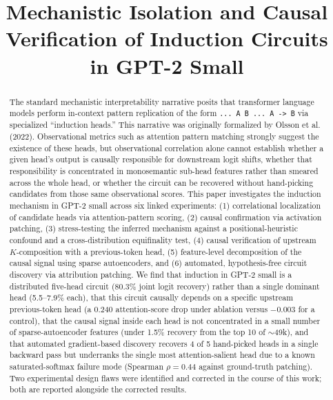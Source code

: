 \documentclass[conference]{IEEEtran}
\begin{document}
\title{Mechanistic Isolation and Causal Verification of Induction Circuits in GPT-2 Small\\ }

\author{
}

\maketitle

\begin{abstract}

The standard mechanistic interpretability narrative posits that transformer language models perform in-context pattern replication of the form \texttt{... A B ... A -> B} via specialized ``induction heads.'' This narrative was originally formalized by Olsson et al. (2022). Observational metrics such as attention pattern matching strongly suggest the existence of these heads, but observational correlation alone cannot establish whether a given head's output is causally responsible for downstream logit shifts, whether that responsibility is concentrated in monosemantic sub-head features rather than smeared across the whole head, or whether the circuit can be recovered without hand-picking candidates from those same observational scores. This paper investigates the induction mechanism in GPT-2 small across six linked experiments: (1) correlational localization of candidate heads via attention-pattern scoring, (2) causal confirmation via activation patching, (3) stress-testing the inferred mechanism against a positional-heuristic confound and a cross-distribution equifinality test, (4) causal verification of upstream $K$-composition with a previous-token head, (5) feature-level decomposition of the causal signal using sparse autoencoders, and (6) automated, hypothesis-free circuit discovery via attribution patching. We find that induction in GPT-2 small is a distributed five-head circuit (80.3\% joint logit recovery) rather than a single dominant head (5.5--7.9\% each), that this circuit causally depends on a specific upstream previous-token head (a 0.240 attention-score drop under ablation versus $-0.003$ for a control), that the causal signal inside each head is not concentrated in a small number of sparse-autoencoder features (under 1.5\% recovery from the top 10 of $\sim$49k), and that automated gradient-based discovery recovers 4 of 5 hand-picked heads in a single backward pass but underranks the single most attention-salient head due to a known saturated-softmax failure mode (Spearman $\rho = 0.44$ against ground-truth patching). Two experimental design flaws were identified and corrected in the course of this work; both are reported alongside the corrected results.

\end{abstract}
\end{document}
